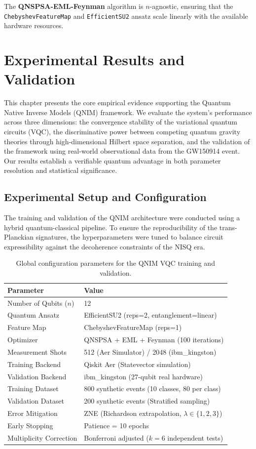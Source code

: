 \documentclass[11pt,a4paper,spanish]{book}
\numberwithin{equation}{chapter}
\numberwithin{figure}{chapter}
\numberwithin{equation}{chapter}
\numberwithin{figure}{chapter}
\numberwithin{table}{chapter}
\begin{document}
The \textbf{QNSPSA-EML-Feynman} algorithm is $n$-agnostic, ensuring that the \texttt{ChebyshevFeatureMap} and \texttt{EfficientSU2} ansatz scale linearly with the available hardware resources.

\chapter{Experimental Results and Validation}
\label{chap:results}

This chapter presents the core empirical evidence supporting the Quantum Native Inverse Models (QNIM) framework. We evaluate the system's performance across three dimensions: the convergence stability of the variational quantum circuits (VQC), the discriminative power between competing quantum gravity theories through high-dimensional Hilbert space separation, and the validation of the framework using real-world observational data from the GW150914 event. Our results establish a verifiable quantum advantage in both parameter resolution and statistical significance.

\section{Experimental Setup and Configuration}

The training and validation of the QNIM architecture were conducted using a hybrid quantum-classical pipeline. To ensure the reproducibility of the trans-Planckian signatures, the hyperparameters were tuned to balance circuit expressibility against the decoherence constraints of the NISQ era.

\begin{table}[ht]
\centering
\caption{Global configuration parameters for the QNIM VQC training and validation.}
\label{tab:exp_setup}
\begin{tabular}{@{}ll@{}}
\toprule
\textbf{Parameter} & \textbf{Value} \\ \midrule
Number of Qubits ($n$) & 12 \\
Quantum Ansatz & EfficientSU2 (reps=2, entanglement=linear) \\
Feature Map & ChebyshevFeatureMap (reps=1) \\
Optimizer & QNSPSA + EML + Feynman (100 iterations) \\
Measurement Shots & 512 (Aer Simulator) / 2048 (ibm\_kingston) \\
Training Backend & Qiskit Aer (Statevector simulation) \\
Validation Backend & ibm\_kingston (27-qubit real hardware) \\
Training Dataset & 800 synthetic events (10 classes, 80 per class) \\
Validation Dataset & 200 synthetic events (Stratified sampling) \\
Error Mitigation & ZNE (Richardson extrapolation, $\lambda \in \{1, 2, 3\}$) \\
Early Stopping & Patience = 10 epochs \\
Multiplicity Correction & Bonferroni adjusted ($k=6$ independent tests) \\ \bottomrule
\end{tabular}
\end{table}
\end{document}

